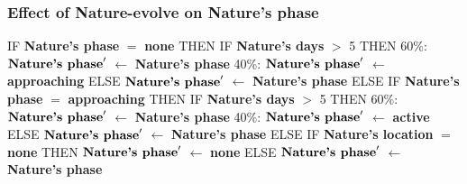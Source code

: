 \documentclass{article}%
\begin{document}
\subsubsection{Effect of Nature{-}evolve on Nature's phase}%
\label{ssubsec:Effect of Nature{-}evolve on Nature's phase}%
\begin{flushleft}%
IF %
\textbf{Nature's phase}%
$=$%
\textbf{none}%
\linebreak%
\hspace*{2em}%
THEN %
IF %
\textbf{Nature's days}%
$>$%
5%
\linebreak%
\hspace*{4em}%
THEN %
\linebreak%
\hspace*{6em}%
60\%: %
$\mbox{\textbf{Nature's phase}} '$%
$\leftarrow$%
\textbf{Nature's phase}%
\linebreak%
\hspace*{6em}%
40\%: %
$\mbox{\textbf{Nature's phase}} '$%
$\leftarrow$%
\textbf{approaching}%
\linebreak%
\hspace*{4em}%
ELSE %
$\mbox{\textbf{Nature's phase}} '$%
$\leftarrow$%
\textbf{Nature's phase}%
\linebreak%
\hspace*{2em}%
ELSE %
IF %
\textbf{Nature's phase}%
$=$%
\textbf{approaching}%
\linebreak%
\hspace*{4em}%
THEN %
IF %
\textbf{Nature's days}%
$>$%
5%
\linebreak%
\hspace*{6em}%
THEN %
\linebreak%
\hspace*{8em}%
60\%: %
$\mbox{\textbf{Nature's phase}} '$%
$\leftarrow$%
\textbf{Nature's phase}%
\linebreak%
\hspace*{8em}%
40\%: %
$\mbox{\textbf{Nature's phase}} '$%
$\leftarrow$%
\textbf{active}%
\linebreak%
\hspace*{6em}%
ELSE %
$\mbox{\textbf{Nature's phase}} '$%
$\leftarrow$%
\textbf{Nature's phase}%
\linebreak%
\hspace*{4em}%
ELSE %
IF %
\textbf{Nature's location}%
$=$%
\textbf{none}%
\linebreak%
\hspace*{6em}%
THEN %
$\mbox{\textbf{Nature's phase}} '$%
$\leftarrow$%
\textbf{none}%
\linebreak%
\hspace*{6em}%
ELSE %
$\mbox{\textbf{Nature's phase}} '$%
$\leftarrow$%
\textbf{Nature's phase}%
\end{flushleft}
\end{document}
